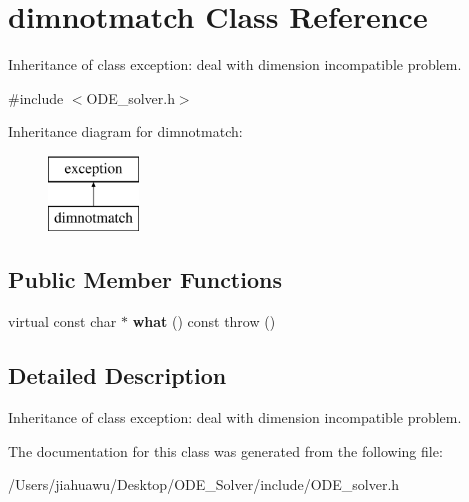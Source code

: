 \hypertarget{classdimnotmatch}{}\section{dimnotmatch Class Reference}
\label{classdimnotmatch}


Inheritance of class exception\+: deal with dimension incompatible problem.  




{\ttfamily \#include $<$O\+D\+E\+\_\+solver.\+h$>$}

Inheritance diagram for dimnotmatch\+:\begin{figure}[H]
\begin{center}
\leavevmode
\includegraphics[height=2.000000cm]{classdimnotmatch}
\end{center}
\end{figure}
\subsection*{Public Member Functions}
\begin{DoxyCompactItemize}
\item 
\mbox{\label{classdimnotmatch_af8ab958cff29859339d5493960a0c444}} 
virtual const char $\ast$ {\bfseries what} () const  throw ()
\end{DoxyCompactItemize}


\subsection{Detailed Description}
Inheritance of class exception\+: deal with dimension incompatible problem. 

The documentation for this class was generated from the following file\+:\begin{DoxyCompactItemize}
\item 
/\+Users/jiahuawu/\+Desktop/\+O\+D\+E\+\_\+\+Solver/include/O\+D\+E\+\_\+solver.\+h\end{DoxyCompactItemize}
